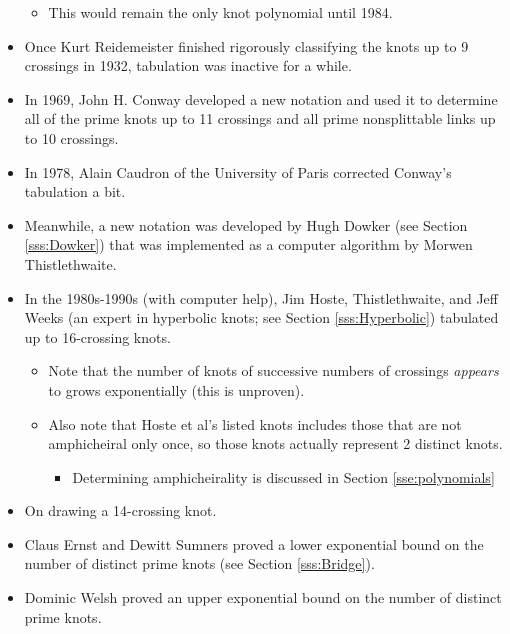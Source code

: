 \documentclass[titlepage]{article}
\numberwithin{figure}{section}
\numberwithin{table}{section}
\numberwithin{equation}{section}
\begin{document}
\begin{itemize}
\begin{itemize}
        \item This would remain the only knot polynomial until 1984.
    \end{itemize}
    \item Once Kurt Reidemeister finished rigorously classifying the knots up to 9 crossings in 1932, tabulation was inactive for a while.
    \item In 1969, John H. Conway developed a new notation and used it to determine all of the prime knots up to 11 crossings and all prime nonsplittable links up to 10 crossings.
    \item In 1978, Alain Caudron of the University of Paris corrected Conway's tabulation a bit.
    \item Meanwhile, a new notation was developed by Hugh Dowker (see Section \ref{sss:Dowker}) that was implemented as a computer algorithm by Morwen Thistlethwaite.
    \item In the 1980s-1990s (with computer help), Jim Hoste, Thistlethwaite, and Jeff Weeks (an expert in hyperbolic knots; see Section \ref{sss:Hyperbolic}) tabulated up to 16-crossing knots.
    \begin{itemize}
        \item Note that the number of knots of successive numbers of crossings \emph{appears} to grows exponentially (this is unproven).
        \item Also note that Hoste et al's listed knots includes those that are not amphicheiral only once, so those knots actually represent 2 distinct knots.
        \begin{itemize}
            \item Determining amphicheirality is discussed in Section \ref{sse:polynomials}
        \end{itemize}
    \end{itemize}
    \item On drawing a 14-crossing knot.
    \item Claus Ernst and Dewitt Sumners proved a lower exponential bound on the number of distinct prime knots (see Section \ref{sss:Bridge}).
    \item Dominic Welsh proved an upper exponential bound on the number of distinct prime knots.
\end{itemize}
\end{document}
